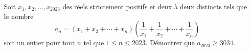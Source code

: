 Soit $x_1, x_2, \ldots, x_{2023}$ des réels strictement positifs et deux à deux distincts tels que le nombre
\[
a_n = (x_1 + x_2 + \cdots + x_n)\left(\frac{1}{x_1} + \frac{1}{x_2} + \cdots + \frac{1}{x_n}\right)
\]
soit un entier pour tout $n$ tel que $1 \leqslant n \leqslant 2023$. Démontrer que $a_{2023} \geqslant 3034$.
